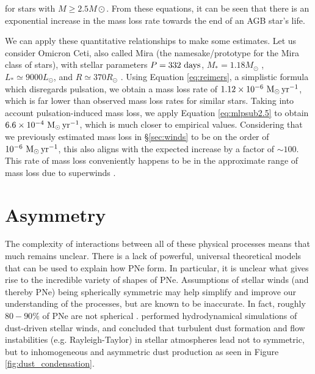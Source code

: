 \documentclass[twocolumn]{aastex63}
\begin{document}
for stars with $M\geq 2.5M\odot$. From these equations, it can be seen that there is an exponential increase in the mass loss rate towards the end of an AGB star's life. 

We can apply these quantitative relationships to make some estimates. Let us consider Omicron Ceti, also called Mira (the namesake/prototype for the Mira class of stars), with stellar parameters $P = 332~{\rm days}$, $M_* = 1.18M_\odot$ \citep{wyatt}, $L_* \simeq 9000 L_\odot$, and $R \simeq 370 R_\odot$ \citep{woodruff}. Using Equation \ref{eq:reimers}, a simplistic formula which disregards pulsation, we obtain a mass loss rate of $1.12\times 10^{-6}~{\rm M_\odot\,yr^{-1}}$, which is far lower than observed mass loss rates for similar stars. Taking into account pulsation-induced mass loss, we apply Equation \ref{eq:mlpsub2.5} to obtain $6.6\times 10^{-4}~{\rm M_\odot\,yr^{-1}}$, which is much closer to empirical values. Considering that we previously estimated mass loss in \S \ref{sec:winds} to be on the order of $10^{-6}~{\rm M_\odot\,yr^{-1}}$, this also aligns with the expected increase by a factor of $\sim 100$. This rate of mass loss conveniently happens to be in the approximate range of mass loss due to superwinds \citep{iben}. 


\section{Asymmetry}\label{sec:asymmetry}

The complexity of interactions between all of these physical processes means that much remains unclear. There is a lack of powerful, universal theoretical models that can be used to explain how PNe form. In particular, it is unclear what gives rise to the incredible variety of shapes of PNe. Assumptions of stellar winds (and thereby PNe) being spherically symmetric may help simplify and improve our understanding of the processes, but are known to be inaccurate. In fact, roughly $80-90\%$ of PNe are not spherical \citep{demarco, soker1997}. \cite{woitke} performed hydrodynamical simulations of dust-driven stellar winds, and concluded that turbulent dust formation and flow instabilities (e.g. Rayleigh-Taylor) in stellar atmospheres lead not to symmetric, but to inhomogeneous and asymmetric dust production as seen in Figure \ref{fig:dust_condensation}.
\end{document}
